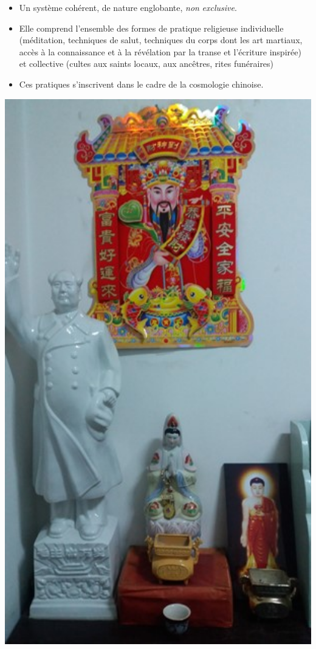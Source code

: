 \FloatBarrier
\begin{Def}
    \begin{itemize}
        \item 	Un système cohérent, de nature englobante, \textit{non} \textit{exclusive}.
\item 	Elle comprend l’ensemble des formes de pratique religieuse individuelle (méditation, techniques de salut, techniques du corps dont les art martiaux, accès à la connaissance et à la révélation par la transe et l’écriture inspirée) et collective (cultes aux saints locaux, aux ancêtres, rites funéraires)
\item 	Ces pratiques s’inscrivent dans le cadre de la cosmologie chinoise.

    \end{itemize}
\end{Def}
\begin{marginfigure}
      \includegraphics[width=1\textwidth]{ConfucianismeTaoismeBouddhismeChinois/Images/ReligionChine.jpg}
\end{marginfigure}
